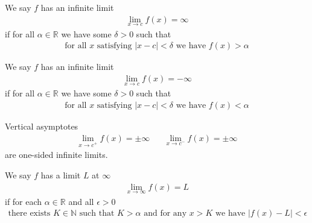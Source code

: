 \begin{definition}
We say $f$ has an infinite limit 
\begin{align*}
    \lim_{x \longrightarrow c} f(x) = \infty
\end{align*}
if for all $\alpha \in \mathbb{R}$ we have some $\delta > 0$ such that
\begin{align*}
    \text{for all} \hspace{4pt} x \hspace{4pt} \text{satisfying} \hspace{4pt} \lvert x - c \rvert < \delta \hspace{4pt} \text{we have} \hspace{4pt} f(x) > \alpha
\end{align*}
\end{definition}

\begin{definition}
We say $f$ has an infinite limit 
\begin{align*}
    \lim_{x \longrightarrow c} f(x) = -\infty
\end{align*}
if for all $\alpha \in \mathbb{R}$ we have some $\delta > 0$ such that
\begin{align*}
    \text{for all} \hspace{4pt} x \hspace{4pt} \text{satisfying} \hspace{4pt} \lvert x - c \rvert < \delta \hspace{4pt} \text{we have} \hspace{4pt} f(x) < \alpha
\end{align*}
\end{definition}

\begin{recall}
Vertical asymptotes
\begin{align*}
    \lim_{x \longrightarrow c^{+}} f(x) = \pm\infty \hspace{20pt} \lim_{x \longrightarrow c^{-}} f(x) = \pm\infty 
\end{align*}
are one-sided infinite limits.
\end{recall}

\begin{definition}
We say $f$ has a limit $L$ at $\infty$ 
\begin{align*}
    \lim_{x \longrightarrow \infty} f(x) = L
\end{align*}
if for each $\alpha \in \mathbb{R}$ and all $\epsilon > 0$ 
\begin{align*}
    \text{there exists} \hspace{4pt} K \in \mathbb{N} \hspace{4pt} \text{such that} \hspace{4pt} K > \alpha \hspace{4pt} \text{and for any} \hspace{4pt} x > K \hspace{4pt} \text{we have} \hspace{4pt} \lvert f(x) - L \rvert < \epsilon
\end{align*}
\end{definition}

